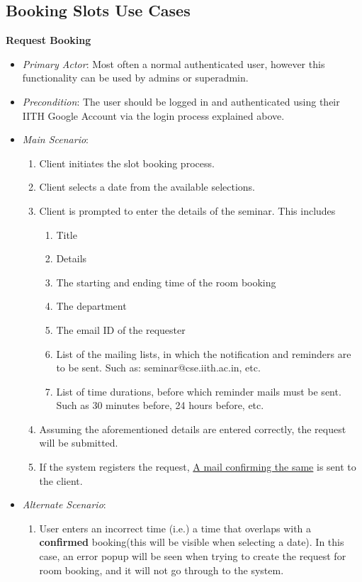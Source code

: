 \documentclass{article}
\begin{document}
\subsection{Booking Slots Use Cases}
\textbf{Request Booking}
\label{ucrequestbooking}
\begin{itemize}
    \item \textit{Primary Actor}: Most often a normal authenticated user, however this functionality can be used by admins or superadmin. 
    \item \textit{Precondition}: The user should be logged in and authenticated using their IITH Google Account via the login process explained above. 
    \item \textit{Main Scenario}: 
    \begin{enumerate}
        \item Client initiates the slot booking process. 
        \item Client selects a date from the available selections.
        \item Client is prompted to enter the details of the seminar. This includes \begin{enumerate}
            \item Title
            \item Details
            \item The starting and ending time of the room booking
            \item The department
            \item The email ID of the requester
            \item List of the mailing lists, in which the notification and reminders are to be sent. Such as: seminar@cse.iith.ac.in, etc.
            \item List of time durations, before which reminder mails must be sent. Such as 30 minutes before, 24 hours before, etc.
        \end{enumerate}
        \item Assuming the aforementioned details are entered correctly, the request will be submitted.
        \item If the system registers the request, \hyperref[ucbookingrequestconfirmation]{A mail confirming the same} is sent to the client.
    \end{enumerate}
    \item \textit{Alternate Scenario}:
    \begin{enumerate}
        \item User enters an incorrect time (i.e.) a time that overlaps with a \textbf{confirmed} booking(this will be visible when selecting a date). In this case, an error popup will be seen when trying to create the request for room booking, and it will not go through to the system. 

\end{enumerate}
\end{itemize}
\end{document}
